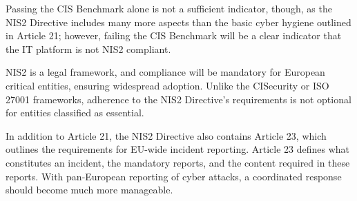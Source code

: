 Passing the CIS Benchmark alone is not a sufficient indicator, though, as the NIS2 Directive includes many more aspects than the basic cyber hygiene outlined in Article 21; however, failing the CIS Benchmark will be a clear indicator that the IT platform is not NIS2 compliant.

NIS2 is a legal framework, and compliance will be mandatory for European critical entities, ensuring widespread adoption. Unlike the CISecurity or ISO 27001 frameworks, adherence to the NIS2 Directive's requirements is not optional for entities classified as essential.

In addition to Article 21, the NIS2 Directive also contains Article 23, which outlines the requirements for EU-wide incident reporting. Article 23 defines what constitutes an incident, the mandatory reports, and the content required in these reports. With pan-European reporting of cyber attacks, a coordinated response should become much more manageable.
